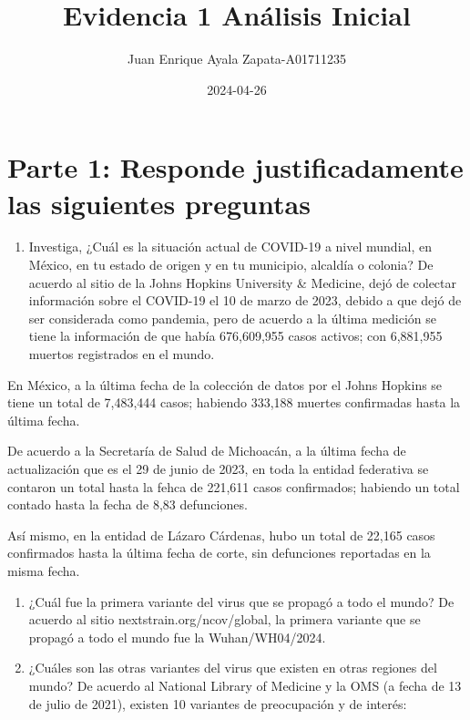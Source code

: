 \documentclass[
]{article}
\title{Evidencia 1 \textbar{} Análisis Inicial}
\author{Juan Enrique Ayala Zapata-A01711235}
\date{2024-04-26}
\providecommand{\tightlist}{%
  \setlength{\itemsep}{0pt}\setlength{\parskip}{0pt}}
\begin{document}
\maketitle

\hypertarget{parte-1-responde-justificadamente-las-siguientes-preguntas}{%
\section{Parte 1: Responde justificadamente las siguientes
preguntas}\label{parte-1-responde-justificadamente-las-siguientes-preguntas}}

\begin{enumerate}
\def\labelenumi{\arabic{enumi}.}
\tightlist
\item
  Investiga, ¿Cuál es la situación actual de COVID-19 a nivel mundial,
  en México, en tu estado de origen y en tu municipio, alcaldía o
  colonia? De acuerdo al sitio de la Johns Hopkins University \&
  Medicine, dejó de colectar información sobre el COVID-19 el 10 de
  marzo de 2023, debido a que dejó de ser considerada como pandemia,
  pero de acuerdo a la última medición se tiene la información de que
  había 676,609,955 casos activos; con 6,881,955 muertos registrados en
  el mundo.
\end{enumerate}

En México, a la última fecha de la colección de datos por el Johns
Hopkins se tiene un total de 7,483,444 casos; habiendo 333,188 muertes
confirmadas hasta la última fecha.

De acuerdo a la Secretaría de Salud de Michoacán, a la última fecha de
actualización que es el 29 de junio de 2023, en toda la entidad
federativa se contaron un total hasta la fehca de 221,611 casos
confirmados; habiendo un total contado hasta la fecha de 8,83
defunciones.

Así mismo, en la entidad de Lázaro Cárdenas, hubo un total de 22,165
casos confirmados hasta la última fecha de corte, sin defunciones
reportadas en la misma fecha.

\begin{enumerate}
\def\labelenumi{\arabic{enumi}.}
\setcounter{enumi}{1}
\item
  ¿Cuál fue la primera variante del virus que se propagó a todo el
  mundo? De acuerdo al sitio nextstrain.org/ncov/global, la primera
  variante que se propagó a todo el mundo fue la Wuhan/WH04/2024.
\item
  ¿Cuáles son las otras variantes del virus que existen en otras
  regiones del mundo? De acuerdo al National Library of Medicine y la
  OMS (a fecha de 13 de julio de 2021), existen 10 variantes de
  preocupación y de interés:
\end{enumerate}
\end{document}
